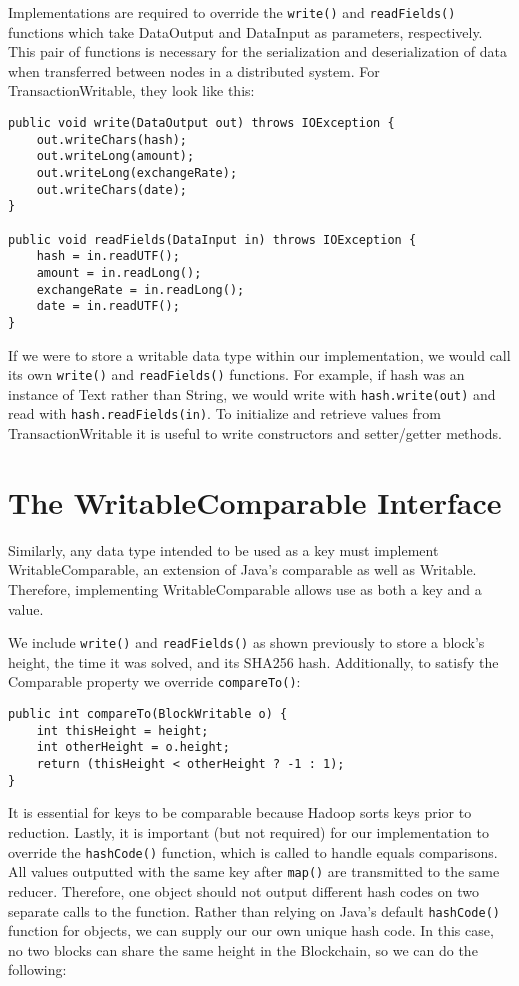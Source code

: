 \documentclass[9pt,twocolumn,twoside]{idsi}
\begin{document}
Implementations are required to override the \lstinline{write()} and \lstinline{readFields()} functions which take DataOutput and DataInput as parameters, respectively. This pair of functions is necessary for the serialization and deserialization of data when  transferred between nodes in a distributed system. For TransactionWritable, they look like this:

\begin{lstlisting}
public void write(DataOutput out) throws IOException {
    out.writeChars(hash);
    out.writeLong(amount);
    out.writeLong(exchangeRate);
    out.writeChars(date);
}

public void readFields(DataInput in) throws IOException {
    hash = in.readUTF();
    amount = in.readLong();
    exchangeRate = in.readLong();
    date = in.readUTF();
}
\end{lstlisting}

If we were to store a writable data type within our implementation, we would call its own \lstinline{write()} and \lstinline{readFields()} functions. For example, if hash was an instance of Text rather than String, we would write with \lstinline{hash.write(out)} and read with \lstinline{hash.readFields(in)}. To initialize and retrieve values from TransactionWritable it is useful to write constructors and setter/getter methods.

\section{The WritableComparable Interface}

Similarly, any data type intended to be used as a key must implement WritableComparable, an extension of Java's comparable as well as Writable. Therefore, implementing WritableComparable allows use as both a key and a value.

We include \lstinline{write()} and \lstinline{readFields()} as shown previously to store a block's height, the time it was solved, and its SHA256 hash. Additionally, to satisfy the Comparable property we override \lstinline{compareTo()}:

\begin{lstlisting}
public int compareTo(BlockWritable o) {
    int thisHeight = height;
    int otherHeight = o.height;
    return (thisHeight < otherHeight ? -1 : 1);
}
\end{lstlisting}

It is essential for keys to be comparable because Hadoop sorts keys prior to reduction. Lastly, it is important (but not required) for our implementation to override the \lstinline{hashCode()} function, which is called to handle equals comparisons. All values outputted with the same key after \lstinline{map()} are transmitted to the same reducer. Therefore, one object should not output different hash codes on two separate calls to the function. Rather than relying on Java's default \lstinline{hashCode()} function for objects, we can supply our our own unique hash code. In this case, no two blocks can share the same height in the Blockchain, so we can do the following:
\end{document}
